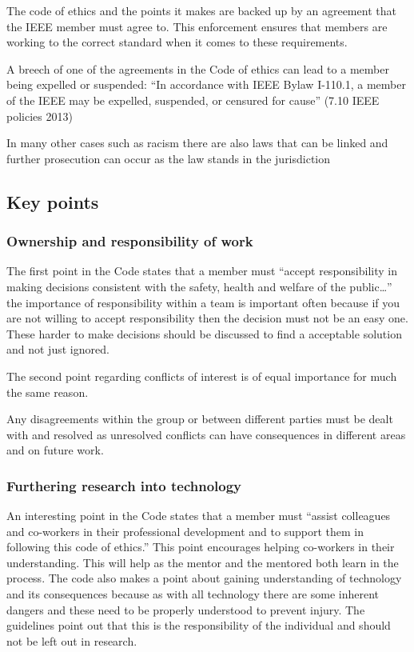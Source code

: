 \documentclass[a4paper]{article}
\begin{document}
The code of ethics and the points it makes are backed up by an agreement that the IEEE member must agree to. This enforcement ensures that members are working to the correct standard when it comes to these requirements.

A breech of one of the agreements in the Code of ethics can lead to a member being expelled or suspended: “In accordance with IEEE Bylaw I-110.1, a member of the IEEE may be expelled, suspended, or censured for cause” (7.10 IEEE policies 2013)

In many other cases such as racism there are also laws that can be linked and further prosecution can occur as the law stands in the jurisdiction
\subsection{Key points}
\subsubsection{Ownership and responsibility of work}

The first point in the Code states that a member must “accept responsibility in making decisions consistent with the safety, health and welfare of the public…” the importance of responsibility within a team is important often because if you are not willing to accept responsibility then the decision must not be an easy one. These harder to make decisions should be discussed to find a acceptable solution and not just ignored.

The second point regarding conflicts of interest is of equal importance for much the same reason. 

Any disagreements within the group or between different parties must be dealt with and resolved as unresolved conflicts can have consequences in different areas and on future work. 
\subsubsection{Furthering research into technology}

An interesting point in the Code states that a member must “assist colleagues and co-workers in their professional development and to support them in following this code of ethics.” This point encourages helping co-workers in their understanding. This will help as the mentor and the mentored both learn in the process. The code also makes a point about gaining understanding of technology and its consequences because as with all technology there are some inherent dangers and these need to be properly understood to prevent injury. The guidelines point out that this is the responsibility of the individual and should not be left out in research.
\end{document}
